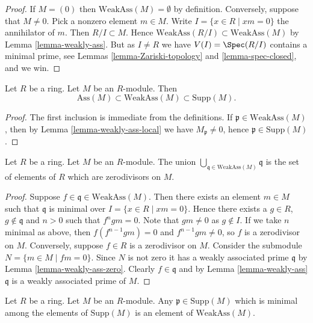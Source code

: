 \begin{proof}
If $M = (0)$ then $\text{WeakAss}(M) = \emptyset$ by definition.
Conversely, suppose that $M \not = 0$. Pick a nonzero element $m \in M$.
Write $I = \{x \in R \mid xm = 0\}$ the annihilator of $m$.
Then $R/I \subset M$. Hence $\text{WeakAss}(R/I) \subset \text{WeakAss}(M)$ by
Lemma \ref{lemma-weakly-ass}.
But as $I \not = R$ we have $V(I) = \Spec(R/I)$ contains a minimal
prime, see
Lemmas \ref{lemma-Zariski-topology} and
\ref{lemma-spec-closed},
and we win.
\end{proof}

\begin{lemma}
\label{lemma-weakly-ass-support}
Let $R$ be a ring. Let $M$ be an $R$-module. Then
$$
\text{Ass}(M) \subset \text{WeakAss}(M) \subset \text{Supp}(M).
$$
\end{lemma}

\begin{proof}
The first inclusion is immediate from the definitions.
If $\mathfrak p \in \text{WeakAss}(M)$, then by
Lemma \ref{lemma-weakly-ass-local}
we have $M_{\mathfrak p} \not = 0$, hence $\mathfrak p \in \text{Supp}(M)$.
\end{proof}

\begin{lemma}
\label{lemma-weakly-ass-zero-divisors}
Let $R$ be a ring.
Let $M$ be an $R$-module.
The union $\bigcup_{\mathfrak q \in \text{WeakAss}(M)} \mathfrak q$
is the set of elements of $R$ which are zerodivisors on $M$.
\end{lemma}

\begin{proof}
Suppose $f \in \mathfrak q \in \text{WeakAss}(M)$.
Then there exists an element $m \in M$ such that
$\mathfrak q$ is minimal over $I = \{x \in R \mid xm = 0\}$.
Hence there exists a $g \in R$, $g \not \in \mathfrak q$ and $n > 0$
such that $f^ngm = 0$. Note that $gm \not = 0$ as $g \not \in I$.
If we take $n$ minimal as above, then $f (f^{n - 1}gm) = 0$
and $f^{n - 1}gm \not = 0$, so $f$ is a zerodivisor on $M$.
Conversely, suppose $f \in R$ is a zerodivisor on $M$.
Consider the submodule $N = \{m \in M \mid fm = 0\}$.
Since $N$ is not zero it has a weakly associated prime $\mathfrak q$ by
Lemma \ref{lemma-weakly-ass-zero}.
Clearly $f \in \mathfrak q$ and by
Lemma \ref{lemma-weakly-ass}
$\mathfrak q$ is a weakly associated prime of $M$.
\end{proof}

\begin{lemma}
\label{lemma-weakly-ass-minimal-prime-support}
Let $R$ be a ring.
Let $M$ be an $R$-module.
Any $\mathfrak p \in \text{Supp}(M)$ which is minimal among the elements
of $\text{Supp}(M)$ is an element of $\text{WeakAss}(M)$.
\end{lemma}

